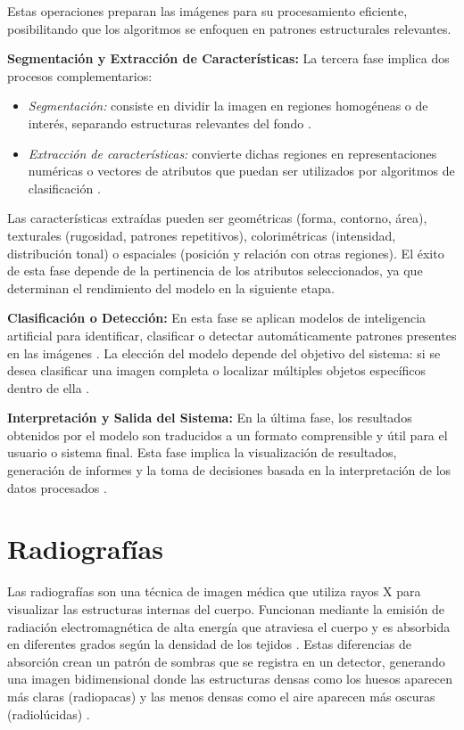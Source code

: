 {Estas operaciones preparan las imágenes para su procesamiento eficiente, posibilitando que los algoritmos se enfoquen en patrones estructurales relevantes.

\textbf{Segmentación y Extracción de Características:} La tercera fase implica dos procesos complementarios:

\begin{itemize}
  \item \textit{Segmentación:} consiste en dividir la imagen en regiones homogéneas o de interés, separando estructuras relevantes del fondo \cite{shapiro2021}.
  \item \textit{Extracción de características:} convierte dichas regiones en representaciones numéricas o vectores de atributos que puedan ser utilizados por algoritmos de clasificación \cite{nixon2020}.
\end{itemize}

Las características extraídas pueden ser geométricas (forma, contorno, área), texturales (rugosidad, patrones repetitivos), colorimétricas (intensidad, distribución tonal) o espaciales (posición y relación con otras regiones). El éxito de esta fase depende de la pertinencia de los atributos seleccionados, ya que determinan el rendimiento del modelo en la siguiente etapa.

\textbf{Clasificación o Detección:} En esta fase se aplican modelos de inteligencia artificial para identificar, clasificar o detectar automáticamente patrones presentes en las imágenes \cite{lecun2015}. La elección del modelo depende del objetivo del sistema: si se desea clasificar una imagen completa o localizar múltiples objetos específicos dentro de ella \cite{krizhevsky2017}.

\textbf{Interpretación y Salida del Sistema:} En la última fase, los resultados obtenidos por el modelo son traducidos a un formato comprensible y útil para el usuario o sistema final. Esta fase implica la visualización de resultados, generación de informes y la toma de decisiones basada en la interpretación de los datos procesados \cite{forsyth2021}.

\section{Radiografías}
Las radiografías son una técnica de imagen médica que utiliza rayos X para visualizar las estructuras internas del cuerpo. Funcionan mediante la emisión de radiación electromagnética de alta energía que atraviesa el cuerpo y es absorbida en diferentes grados según la densidad de los tejidos \cite{bushberg2021essential}. Estas diferencias de absorción crean un patrón de sombras que se registra en un detector, generando una imagen bidimensional donde las estructuras densas como los huesos aparecen más claras (radiopacas) y las menos densas como el aire aparecen más oscuras (radiolúcidas) \cite{carlton2020principles}.

}
